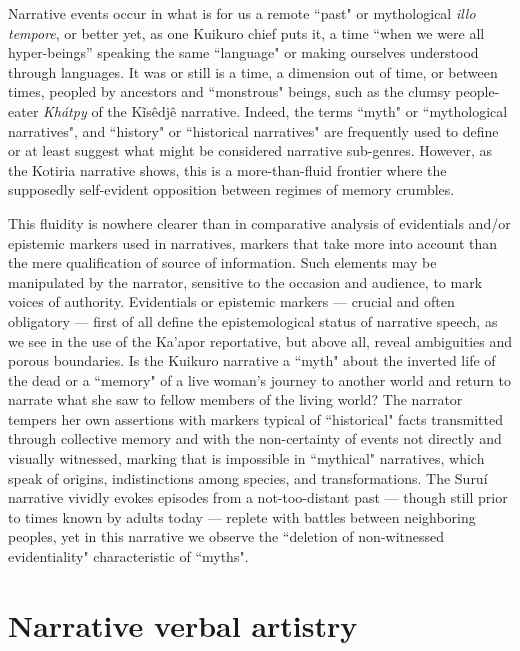 \documentclass[output=paper,
modfonts,nonflat
]{langsci/langscibook}
\begin{document}
Narrative events occur in what is for us a remote “past" or mythological \textit{illo tempore}, or better yet, as one Kuikuro chief puts it, a time “when we were all hyper-beings” speaking the same “language" or making ourselves understood through languages. It was or still is a time, a dimension out of time, or between times, peopled by ancestors and “monstrous" beings, such as the clumsy people-eater \textit{Khátpy} of the Kĩsêdjê narrative. Indeed, the terms “myth" or “mythological narratives", and “history" or “historical narratives" are frequently used to define or at least suggest what might be considered narrative sub-genres. However, as the Kotiria narrative shows, this is a more-than-fluid frontier where the supposedly self-evident opposition between regimes of memory crumbles.
    
This fluidity is nowhere clearer than in comparative analysis of evidentials and/or epistemic markers used in narratives, markers that take more into account than the mere qualification of source of information. Such elements may be manipulated by the narrator, sensitive to the occasion and audience, to mark voices of authority. Evidentials or epistemic markers — crucial and often obligatory — first of all define the epistemological status of narrative speech, as we see in the use of the Ka’apor reportative, but above all, reveal ambiguities and porous boundaries. Is the Kuikuro narrative a “myth" about the inverted life of the dead or a “memory" of a live woman’s journey to another world and return to narrate what she saw to fellow  members of the living world? The narrator tempers her own assertions with markers typical of “historical" facts transmitted through collective memory and with the non-certainty of events not directly and visually witnessed, marking that is impossible in “mythical" narratives, which speak of origins, indistinctions among species, and transformations. The Suruí narrative vividly evokes episodes from a not-too-distant past — though still prior to times known by adults today — replete with battles between neighboring peoples, yet in this narrative we observe the “deletion of non-witnessed evidentiality" characteristic of “myths".

\section{Narrative verbal artistry}
\end{document}

